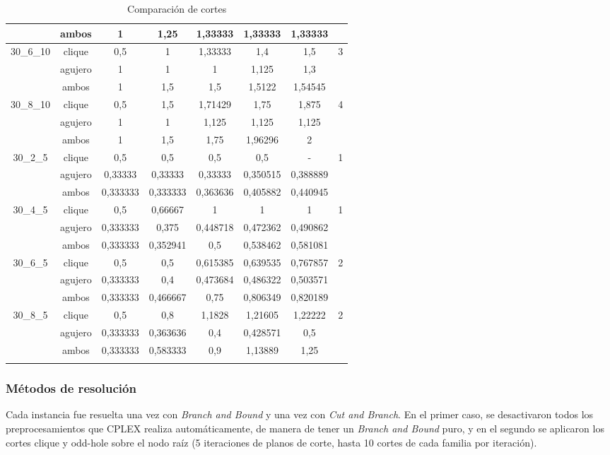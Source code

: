 \documentclass[a4paper]{article}
\begin{document}
\begin{center}
\begin{longtable}{|c|c|c|c|c|c|c|c|}
\cline{2-7}
&ambos&1&1,25&1,33333&1,33333&1,33333&\\
\hline
30_6_10&clique&0,5&1&1,33333&1,4&1,5&3\\
\cline{2-7}
&agujero&1&1&1&1,125&1,3&\\
\cline{2-7}
&ambos&1&1,5&1,5&1,5122&1,54545&\\
\hline
30_8_10&clique&0,5&1,5&1,71429&1,75&1,875&4\\
\cline{2-7}
&agujero&1&1&1,125&1,125&1,125&\\
\cline{2-7}
&ambos&1&1,5&1,75&1,96296&2&\\
\hline
30_2_5&clique&0,5&0,5&0,5&0,5&-&1\\
\cline{2-7}
&agujero&0,33333&0,33333&0,33333&0,350515&0,388889&\\
\cline{2-7}
&ambos&0,333333&0,333333&0,363636&0,405882&0,440945&\\
\hline
30_4_5&clique&0,5&0,66667&1&1&1&1\\
\cline{2-7}
&agujero&0,333333&0,375&0,448718&0,472362&0,490862&\\
\cline{2-7}
&ambos&0,333333&0,352941&0,5&0,538462&0,581081&\\
\hline
30_6_5&clique&0,5&0,5&0,615385&0,639535&0,767857&2\\
\cline{2-7}
&agujero&0,333333&0,4&0,473684&0,486322&0,503571&\\
\cline{2-7}
&ambos&0,333333&0,466667&0,75&0,806349&0,820189&\\
\hline
30_8_5&clique&0,5&0,8&1,1828&1,21605&1,22222&2\\
\cline{2-7}
&agujero&0,333333&0,363636&0,4&0,428571&0,5&\\
\cline{2-7}
&ambos&0,333333&0,583333&0,9&1,13889&1,25&\\
\hline
\caption{Comparación de cortes}\label{tab:cortes}
\end{longtable}
\end{center}

\subsubsection{Métodos de resolución}

Cada instancia fue resuelta una vez con {\it Branch and Bound} y una vez con {\it Cut and Branch}. En el primer caso, se desactivaron todos los preprocesamientos que CPLEX realiza automáticamente, de manera de tener un {\it Branch and Bound} puro, y en el segundo se aplicaron los cortes clique y odd-hole sobre el nodo raíz (5 iteraciones de planos de corte, hasta 10 cortes de cada familia por iteración). 
\end{document}
